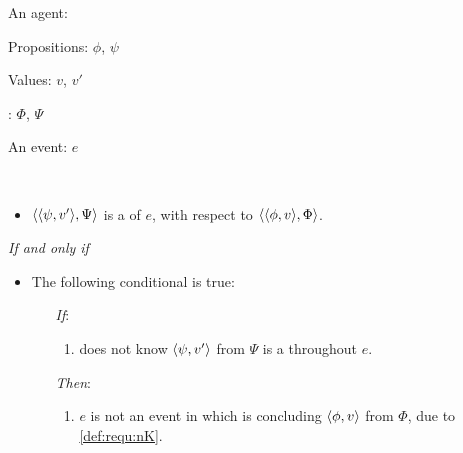 \begin{note}
  \begin{definition}[A \requ{0}]
    \label{def:requ}
    \begin{itemize*}[noitemsep, label=\(\circ\)]
    \item
      An agent: \vAgent{}
    \item
      Propositions: \(\phi\), \(\psi\)
    \item
      Values: \(v\), \(v'\)
    \item
      : \(\Phi\), \(\Psi\)
    \item
      An event: \(e\)
    \item
      \mbox{ }
    \end{itemize*}

    \begin{itemize}
    \item
      \(\langle \langle \psi, v' \rangle, \Psi \rangle\) is a \emph{\requ{}} of \(e\), with respect to \(\langle \langle \phi, v \rangle, \Phi \rangle\).
    \end{itemize}

    \emph{If and only if}

    \begin{itemize}
    \item
      The following conditional is true:
      \begin{itemize}
      \item[\emph{If}:]
        \begin{enumerate}[label=\alph*., ref=(\alph*), series=requDefSeries]
        \item
          \label{def:requ:nK}
          \vAgent{} does not know \(\langle \psi, v' \rangle\) from \(\Psi\) is a \fc{} throughout \(e\).
        \end{enumerate}
      \item[\emph{Then}:]
        \begin{enumerate}[label=\alph*., ref=(\alph*), resume*=requDefSeries]
        \item
          \label{def:requ:nC}
          \(e\) is not an event in which \vAgent{} is concluding \(\langle \phi, v \rangle\) from \(\Phi\), due to \ref{def:requ:nK}.
        \end{enumerate}
      \end{itemize}
    \end{itemize}
    \vspace{-\baselineskip}
  \end{definition}
\end{note}

